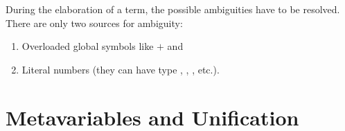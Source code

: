 During the elaboration of a term, the possible ambiguities have to be resolved.
There are only two sources for ambiguity:
%
\begin{enumerate}

\item Overloaded global symbols like $+$ and 

\item Literal numbers (they can have type , ,
, etc.).

\end{enumerate}




\section{Metavariables and Unification}

